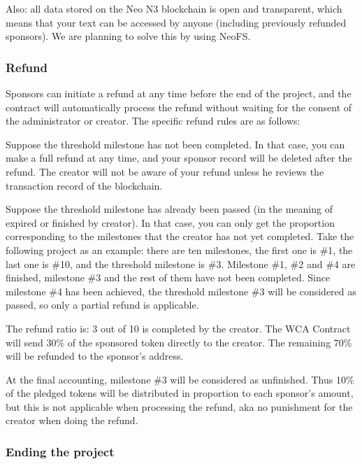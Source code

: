 \documentclass[12pt,a4paper]{article}
\begin{document}
    Also: all data stored on the Neo N3 blockchain is open and transparent, which
    means that your text can be accessed by anyone (including previously refunded
    sponsors). We are planning to solve this by using NeoFS.

    \subsubsection{Refund}

    Sponsors can initiate a refund at any time before the end of the project,
    and the contract will automatically process the refund without waiting for
    the consent of the administrator or creator.
    The specific refund rules are as follows:

    Suppose the threshold milestone has not been completed.
    In that case, you can make a full refund at any time, and your sponsor record
    will be deleted after the refund.
    The creator will not be aware of your refund unless he reviews the transaction
    record of the blockchain.

    Suppose the threshold milestone has already been passed (in the meaning of
    expired or finished by creator).
    In that case, you can only get the proportion corresponding to the milestones
    that the creator has not yet completed.
    Take the following project as an example: there are ten milestones, the first
    one is \#1, the last one is \#10, and the threshold milestone is \#3.
    Milestone \#1, \#2 and \#4 are finished, milestone \#3 and the rest of them
    have not been completed.
    Since milestone \#4 has been achieved, the threshold milestone \#3 will be
    considered as passed, so only a partial refund is applicable.

    The refund ratio is: 3 out of 10 is completed by the creator.
    The WCA Contract will send 30\% of the sponsored token directly to the creator.
    The remaining 70\% will be refunded to the sponsor's address.

    At the final accounting, milestone \#3 will be considered as unfinished.
    Thus 10\% of the pledged tokens will be distributed in proportion to
    each sponsor's amount, but this is not applicable when processing the refund,
    aka no punishment for the creator when doing the refund.

    \subsubsection{Ending the project}
\end{document}
